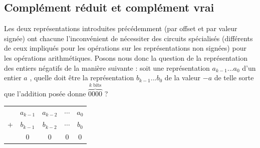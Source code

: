 



\subsection{Complément réduit et complément vrai}

Les deux représentations introduites précédemment (par offset et par valeur signée) ont chacune l'inconvénient de nécessiter des circuits spécialisés (différents de ceux impliqués pour les opérations sur les représentations non signées) pour les opérations arithmétiques. Posons nous donc la question de la représentation des entiers négatifs de la manière suivante : soit une représentation $a_{k-1} ... a_0$ d'un entier $a$ , quelle doit être la représentation $b_{k-1}...b_0$ de la valeur $-a$ de telle sorte que l'addition posée donne $\overbrace{0000}^{k\mbox{ bits}}$ ?\\

\begin{center}
\begin{tabular}{ccccc}
  & $a_{k-1}$ & $a_{k-2}$ & $\cdots$ & $a_0$\\
+ & $b_{k-1}$ & $b_{k-2}$ & $\cdots$ & $b_0$ \\
\hline
  & 0        &  0       &  0       & 0
\end{tabular}
\end{center}

